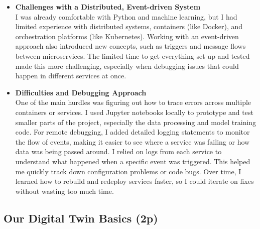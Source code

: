 \documentclass[A4,10pt]{article}
\begin{document}
\begin{itemize}
    \item \textbf{Challenges with a Distributed, Event-driven System} \\
    I was already comfortable with Python and machine learning, but I had limited experience with distributed systems, containers (like Docker), and orchestration platforms (like Kubernetes). Working with an event-driven approach also introduced new concepts, such as triggers and message flows between microservices. The limited time to get everything set up and tested made this more challenging, especially when debugging issues that could happen in different services at once.

    \item \textbf{Difficulties and Debugging Approach} \\
    One of the main hurdles was figuring out how to trace errors across multiple containers or services. I used Jupyter notebooks locally to prototype and test smaller parts of the project, especially the data processing and model training code. For remote debugging, I added detailed logging statements to monitor the flow of events, making it easier to see where a service was failing or how data was being passed around. I relied on logs from each service to understand what happened when a specific event was triggered. This helped me quickly track down configuration problems or code bugs. Over time, I learned how to rebuild and redeploy services faster, so I could iterate on fixes without wasting too much time.
\end{itemize}


\subsection{Our Digital Twin Basics (2p)}
\label{sec:digital_twin_basics}
\end{document}
